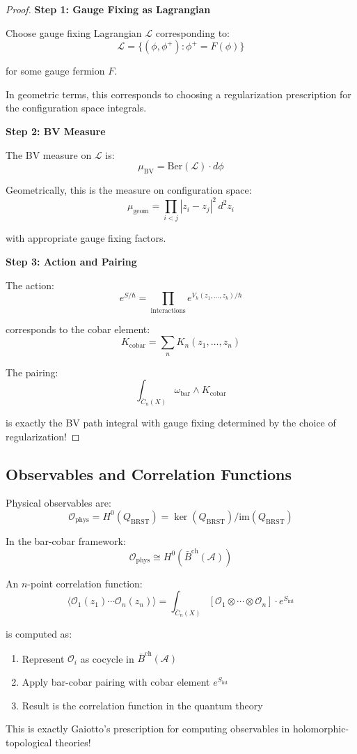 \begin{proof}
\textbf{Step 1: Gauge Fixing as Lagrangian}

Choose gauge fixing Lagrangian $\mathcal{L}$ corresponding to:
$$\mathcal{L} = \{(\phi, \phi^+) : \phi^+ = F(\phi)\}$$

for some gauge fermion $F$.

In geometric terms, this corresponds to choosing a regularization prescription 
for the configuration space integrals.

\textbf{Step 2: BV Measure}

The BV measure on $\mathcal{L}$ is:
$$\mu_{\text{BV}} = \text{Ber}(\mathcal{L}) \cdot d\phi$$

Geometrically, this is the measure on configuration space:
$$\mu_{\text{geom}} = \prod_{i<j} |z_i - z_j|^2 \, d^2z_i$$

with appropriate gauge fixing factors.

\textbf{Step 3: Action and Pairing}

The action:
$$e^{S/\hbar} = \prod_{\text{interactions}} e^{V_k(z_1, \ldots, z_k)/\hbar}$$

corresponds to the cobar element:
$$K_{\text{cobar}} = \sum_n K_n(z_1, \ldots, z_n)$$

The pairing:
$$\int_{\overline{C}_n(X)} \omega_{\text{bar}} \wedge K_{\text{cobar}}$$

is exactly the BV path integral with gauge fixing determined by the choice of 
regularization!
\end{proof}

\subsection{Observables and Correlation Functions}

\begin{theorem}[Observables = Cohomology]
Physical observables are:
$$\mathcal{O}_{\text{phys}} = H^0(Q_{\text{BRST}}) = 
\ker(Q_{\text{BRST}})/\text{im}(Q_{\text{BRST}})$$

In the bar-cobar framework:
$$\mathcal{O}_{\text{phys}} \cong H^0(\bar{B}^{\text{ch}}(\mathcal{A}))$$
\end{theorem}

\begin{example}
An $n$-point correlation function:
$$\langle \mathcal{O}_1(z_1) \cdots \mathcal{O}_n(z_n) \rangle = 
\int_{\overline{C}_n(X)} [\mathcal{O}_1 \otimes \cdots \otimes \mathcal{O}_n] 
\cdot e^{S_{\text{int}}}$$

is computed as:
\begin{enumerate}
\item Represent $\mathcal{O}_i$ as cocycle in $\bar{B}^{\text{ch}}(\mathcal{A})$
\item Apply bar-cobar pairing with cobar element $e^{S_{\text{int}}}$
\item Result is the correlation function in the quantum theory
\end{enumerate}

This is exactly Gaiotto's prescription for computing observables in 
holomorphic-topological theories!
\end{example}

